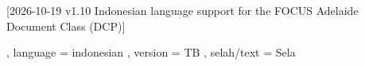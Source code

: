 %
%
% 

[2026-10-19 v1.10
   Indonesian language support for the FOCUS Adelaide Document Class (DCP)]


  {
    , language           = indonesian
    , version            = TB
    , selah/text         = Sela
  }

\endinput
